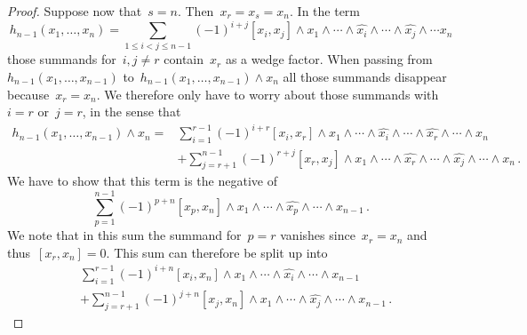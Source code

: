 \begin{proof}
  Suppose now that~$s = n$.
  Then~$x_r = x_s = x_n$.
  In the term
  \[
    h_{n-1}(x_1, \dotsc, x_n)
    =
    \sum_{1 \leq i < j \leq n-1}
    (-1)^{i+j}
    [x_i, x_j] \wedge x_1 \wedge \dotsb \wedge \widehat{x_i} \wedge \dotsb \wedge \widehat{x_j} \wedge \dotsb x_n
  \]
  those summands for~$i, j \neq r$ contain~$x_r$ as a wedge factor.
  When passing from~$h_{n-1}(x_1, \dotsc, x_{n-1})$ to~$h_{n-1}(x_1, \dotsc, x_{n-1}) \wedge x_n$ all those summands disappear because~$x_r = x_n$.
  We therefore only have to worry about those summands with~$i = r$ or~$j = r$, in the sense that
  \begin{equation}
    \label{first term as sum of two sums}
    \begin{aligned}
      h_{n-1}(x_1, \dotsc, x_{n-1}) \wedge x_n
      ={}&
      \sum_{i=1}^{r-1}
      (-1)^{i+r}
      [x_i, x_r] \wedge x_1 \wedge \dotsb \wedge \widehat{x_i} \wedge \dotsb \wedge \widehat{x_r} \wedge \dotsb \wedge x_n
      \\
      {}&
      +
      \sum_{j=r+1}^{n-1}
      (-1)^{r+j}
      [x_r, x_j] \wedge x_1 \wedge \dotsb \wedge \widehat{x_r} \wedge \dotsb \wedge \widehat{x_j} \wedge \dotsb \wedge x_n \,.
    \end{aligned}
  \end{equation}
  We have to show that this term is the negative of
  \[
    \sum_{p=1}^{n-1}
    (-1)^{p+n}
    [x_p, x_n] \wedge x_1 \wedge \dotsb \wedge \widehat{x_p} \wedge \dotsb \wedge x_{n-1} \,.
  \]
  We note that in this sum the summand for~$p = r$ vanishes since~$x_r = x_n$ and thus~$[x_r, x_n] = 0$.
  This sum can therefore be split up into
  \begin{equation}
    \label{second term as sum of two sums}
    \begin{aligned}
      {}&
      \sum_{i=1}^{r-1}
      (-1)^{i+n}
      [x_i, x_n] \wedge x_1 \wedge \dotsb \wedge \widehat{x_i} \wedge \dotsb \wedge x_{n-1}
      \\
      {}&
      +
      \sum_{j=r+1}^{n-1}
      (-1)^{j+n}
      [x_j, x_n] \wedge x_1 \wedge \dotsb \wedge \widehat{x_j} \wedge \dotsb \wedge x_{n-1} \,.
    \end{aligned}
  \end{equation}


\end{proof}
